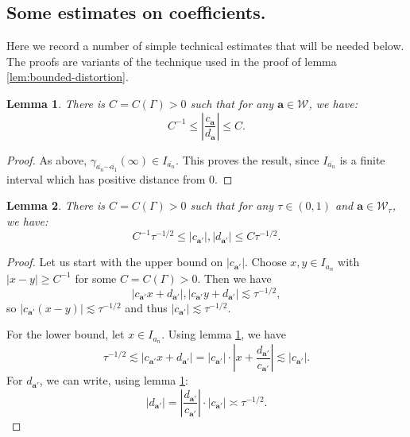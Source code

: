 \documentclass[12pt]{amsart}
\newcommand*\abs[1]{
	\left|#1\right|
}
\newtheorem{lem}{Lemma}[section]
\theoremstyle{definition}
\renewcommand{\leq}{\leqslant}
\renewcommand{\geq}{\geqslant}
\begin{document}
\subsection{Some estimates on coefficients.} Here we record a number of simple technical estimates that will be needed below. The proofs are variants of the technique used in the proof of lemma \ref{lem:bounded-distortion}.
\begin{lem}\label{lem:bound-quotient}
There is $C = C(\Gamma) > 0$ such that for any $\mathbf{a} \in\mathcal{W}$, we have:
\[C^{-1} \leq \abs{\frac{c_\mathbf{a}}{d_\mathbf{a}}} \leq C.\]
\end{lem}
\begin{proof}
As above, $\gamma_{\overline{a_n}\cdots\overline{a_1}}(\infty) \in I_{\overline{a_n}}$. This proves the result, since $I_{\overline{a_n}}$ is a finite interval which has positive distance from $0$.
\end{proof}
\begin{lem}
\label{lem:bound-c-d}
 There is $C = C(\Gamma) > 0$ such that for any $\tau \in(0,1)$ and $\mathbf{a} \in\mathcal{W}_\tau$, we have:
 \[C^{-1} \tau^{-1/2} \leq \abs{c_\mathbf{a'}}, \abs{d_\mathbf{a'}} \leq C\tau^{-1/2}.\]
\end{lem}
\begin{proof}
Let us start with the upper bound on $\abs{c_{\mathbf{a}'}}$. Choose $x, y\in I_{a_n}$ with $\abs{x - y} \geq C^{-1}$ for some $C = C(\Gamma) > 0$. Then we have
\[\abs{c_{\mathbf{a}'}x + d_{\mathbf{a}'}}, \abs{c_{\mathbf{a}'}y +d_{\mathbf{a}'}} \lesssim \tau^{-1/2},\]
so $\abs{c_{\mathbf{a}'}(x - y)} \lesssim \tau^{-1/2}$ and thus $\abs{c_{\mathbf{a}'}} \lesssim \tau^{-1/2}$.

For the lower bound, let $x \in I_{a_n}$. Using lemma \ref{lem:bound-quotient}, we have
\[\tau^{-1/2} \lesssim \abs{c_{\mathbf{a}'} x + d_{\mathbf{a}'}} = \abs{c_{\mathbf{a}'}} \cdot \abs{x + \frac{d_{\mathbf{a}'}}{c_{\mathbf{a}'}}} \lesssim \abs{c_{\mathbf{a}'}}.\]
For $d_{\mathbf{a}'}$, we can write, using lemma \ref{lem:bound-quotient}:
\[\abs{d_{\mathbf{a}'}} = \abs{\frac{d_{\mathbf{a}'}}{c_{\mathbf{a}'}}}\cdot\abs{c_{\mathbf{a}'}} \asymp \tau^{-1/2}.\]
\end{proof}
\end{document}
